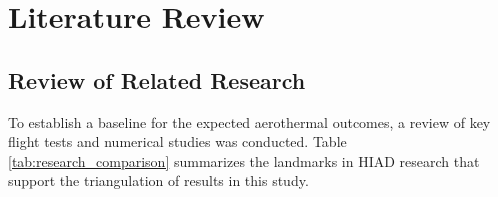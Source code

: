 \chapter{Literature Review}
\label{chap:literature}



\section{Review of Related Research}

To establish a baseline for the expected aerothermal outcomes, a review of key flight tests and numerical studies was conducted. Table \ref{tab:research_comparison} summarizes the landmarks in HIAD research that support the triangulation of results in this study.

